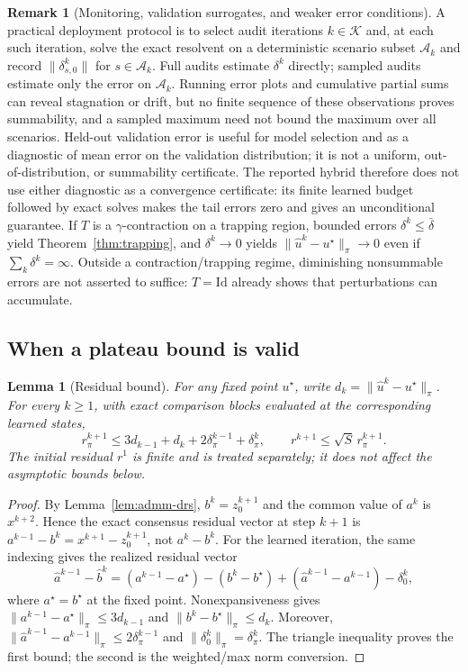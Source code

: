 \documentclass[preprint,12pt,3p]{elsarticle}
\newtheorem{lemma}[theorem]{Lemma}
\theoremstyle{definition}
\newtheorem{remark}[theorem]{Remark}
\begin{document}
\begin{remark}[Monitoring, validation surrogates, and weaker error conditions]\label{rem:monitoring}
A practical deployment protocol is to select audit iterations $k\in\mathcal K$ and, at each such iteration, solve the exact resolvent on a deterministic scenario subset $\mathcal A_k$ and record $\|\delta_{s,0}^k\|$ for $s\in\mathcal A_k$. Full audits estimate $\delta^k$ directly; sampled audits estimate only the error on $\mathcal A_k$. Running error plots and cumulative partial sums can reveal stagnation or drift, but no finite sequence of these observations proves summability, and a sampled maximum need not bound the maximum over all scenarios. Held-out validation error is useful for model selection and as a diagnostic of mean error on the validation distribution; it is not a uniform, out-of-distribution, or summability certificate. The reported hybrid therefore does not use either diagnostic as a convergence certificate: its finite learned budget followed by exact solves makes the tail errors zero and gives an unconditional guarantee. If $T$ is a $\gamma$-contraction on a trapping region, bounded errors $\delta^k\leq\bar\delta$ yield Theorem~\ref{thm:trapping}, and $\delta^k\to0$ yields $\|\widehat u^k-u^\star\|_\pi\to0$ even if $\sum_k\delta^k=\infty$. Outside a contraction/trapping regime, diminishing nonsummable errors are not asserted to suffice: $T=\mathrm{Id}$ already shows that perturbations can accumulate.
\end{remark}

\subsection{When a plateau bound is valid}
\begin{lemma}[Residual bound]\label{lem:residualbound}
For any fixed point $u^\star$, write $d_k=\|\widehat u^k-u^\star\|_\pi$. For every $k\geq1$, with exact comparison blocks evaluated at the corresponding learned states,
\begin{equation}
r_\pi^{k+1}\leq3d_{k-1}+d_k+2\delta_\pi^{k-1}+\delta_\pi^k,
\qquad
r^{k+1}\leq\sqrt S\,r_\pi^{k+1}.
\label{eq:residualbound}
\end{equation}
The initial residual $r^1$ is finite and is treated separately; it does not affect the asymptotic bounds below.
\end{lemma}
\begin{proof}
By Lemma~\ref{lem:admm-drs}, $b^k=z_0^{k+1}$ and the common value of $a^k$ is $x^{k+2}$. Hence the exact consensus residual vector at step $k+1$ is $a^{k-1}-b^k=x^{k+1}-z_0^{k+1}$, not $a^k-b^k$. For the learned iteration, the same indexing gives the realized residual vector
\[
\widehat a^{k-1}-\widehat b^k
=(a^{k-1}-a^\star)-(b^k-b^\star)
+(\widehat a^{k-1}-a^{k-1})-\delta_0^k,
\]
where $a^\star=b^\star$ at the fixed point. Nonexpansiveness gives
$\|a^{k-1}-a^\star\|_\pi\leq3d_{k-1}$ and
$\|b^k-b^\star\|_\pi\leq d_k$. Moreover,
$\|\widehat a^{k-1}-a^{k-1}\|_\pi\leq2\delta_\pi^{k-1}$ and
$\|\delta_0^k\|_\pi=\delta_\pi^k$. The triangle inequality proves the first bound; the second is the weighted/max norm conversion.
\end{proof}
\end{document}
